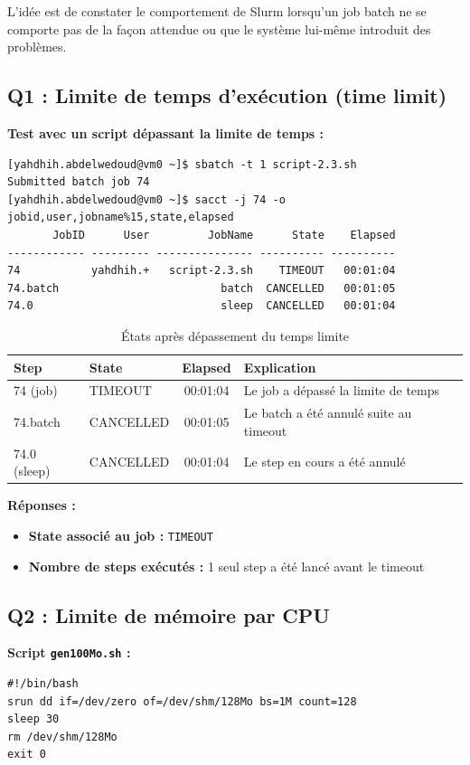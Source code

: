 \documentclass[12pt,a4paper]{article}
\newcommand{\code}[1]{\texttt{#1}}
\begin{document}
L'idée est de constater le comportement de Slurm lorsqu'un job batch ne se comporte pas de la façon attendue ou que le système lui-même introduit des problèmes.

\subsection{Q1 : Limite de temps d'exécution (time limit)}

\textbf{Test avec un script dépassant la limite de temps :}
\begin{lstlisting}
[yahdhih.abdelwedoud@vm0 ~]$ sbatch -t 1 script-2.3.sh
Submitted batch job 74
[yahdhih.abdelwedoud@vm0 ~]$ sacct -j 74 -o jobid,user,jobname%15,state,elapsed
       JobID      User         JobName      State    Elapsed 
------------ --------- --------------- ---------- ---------- 
74           yahdhih.+   script-2.3.sh    TIMEOUT   00:01:04 
74.batch                         batch  CANCELLED   00:01:05 
74.0                             sleep  CANCELLED   00:01:04 
\end{lstlisting}

\begin{table}[h]
\centering
\begin{tabular}{|l|l|c|p{6cm}|}
\hline
\textbf{Step} & \textbf{State} & \textbf{Elapsed} & \textbf{Explication} \\
\hline
74 (job) & TIMEOUT & 00:01:04 & Le job a dépassé la limite de temps \\
74.batch & CANCELLED & 00:01:05 & Le batch a été annulé suite au timeout \\
74.0 (sleep) & CANCELLED & 00:01:04 & Le step en cours a été annulé \\
\hline
\end{tabular}
\caption{États après dépassement du temps limite}
\end{table}

\textbf{Réponses :}
\begin{itemize}
    \item \textbf{State associé au job :} \code{TIMEOUT}
    \item \textbf{Nombre de steps exécutés :} 1 seul step a été lancé avant le timeout
\end{itemize}

\subsection{Q2 : Limite de mémoire par CPU}

\textbf{Script \code{gen100Mo.sh} :}
\begin{lstlisting}
#!/bin/bash
srun dd if=/dev/zero of=/dev/shm/128Mo bs=1M count=128
sleep 30
rm /dev/shm/128Mo
exit 0
\end{lstlisting}
\end{document}

